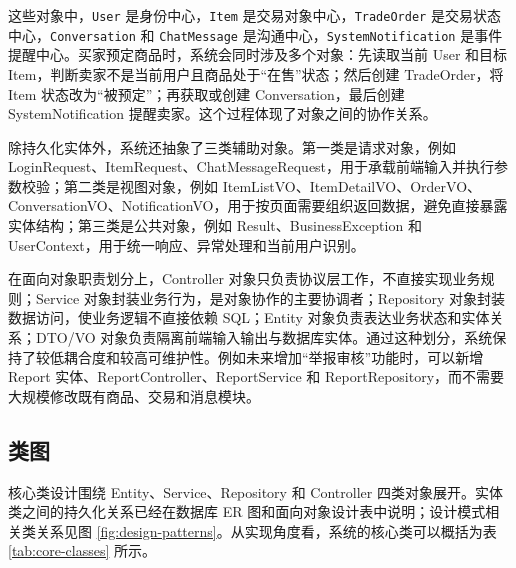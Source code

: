 ﻿\documentclass[UTF8,a4paper,12pt]{ctexart}
\begin{document}
这些对象中，\texttt{User} 是身份中心，\texttt{Item} 是交易对象中心，\texttt{TradeOrder} 是交易状态中心，\texttt{Conversation} 和 \texttt{ChatMessage} 是沟通中心，\texttt{SystemNotification} 是事件提醒中心。买家预定商品时，系统会同时涉及多个对象：先读取当前 User 和目标 Item，判断卖家不是当前用户且商品处于“在售”状态；然后创建 TradeOrder，将 Item 状态改为“被预定”；再获取或创建 Conversation，最后创建 SystemNotification 提醒卖家。这个过程体现了对象之间的协作关系。

除持久化实体外，系统还抽象了三类辅助对象。第一类是请求对象，例如 LoginRequest、ItemRequest、ChatMessageRequest，用于承载前端输入并执行参数校验；第二类是视图对象，例如 ItemListVO、ItemDetailVO、OrderVO、ConversationVO、NotificationVO，用于按页面需要组织返回数据，避免直接暴露实体结构；第三类是公共对象，例如 Result、BusinessException 和 UserContext，用于统一响应、异常处理和当前用户识别。

在面向对象职责划分上，Controller 对象只负责协议层工作，不直接实现业务规则；Service 对象封装业务行为，是对象协作的主要协调者；Repository 对象封装数据访问，使业务逻辑不直接依赖 SQL；Entity 对象负责表达业务状态和实体关系；DTO/VO 对象负责隔离前端输入输出与数据库实体。通过这种划分，系统保持了较低耦合度和较高可维护性。例如未来增加“举报审核”功能时，可以新增 Report 实体、ReportController、ReportService 和 ReportRepository，而不需要大规模修改既有商品、交易和消息模块。

\subsection{类图}
核心类设计围绕 Entity、Service、Repository 和 Controller 四类对象展开。实体类之间的持久化关系已经在数据库 ER 图和面向对象设计表中说明；设计模式相关类关系见图 \ref{fig:design-patterns}。从实现角度看，系统的核心类可以概括为表 \ref{tab:core-classes} 所示。
\end{document}
